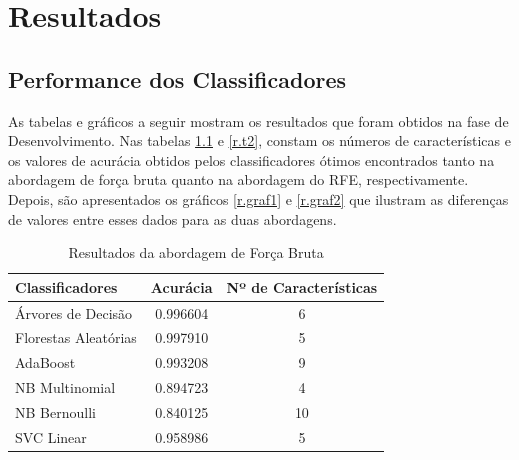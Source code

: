 \chapter{Resultados}
\label{c.resultados}

\section{Performance dos Classificadores}

As tabelas e gráficos a seguir mostram os resultados que foram obtidos na fase de Desenvolvimento. Nas tabelas \ref{r.t1} e \ref{r.t2}, constam os números de características e os valores de acurácia obtidos pelos classificadores ótimos encontrados tanto na abordagem de força bruta quanto na abordagem do RFE, respectivamente. Depois, são apresentados os gráficos \ref{r.graf1} e \ref{r.graf2} que ilustram as diferenças de valores entre esses dados para as duas abordagens.



\begin{table}[h!]
  \begin{center}
    \caption{Resultados da abordagem de Força Bruta}
    \label{r.t1}
    \begin{tabular}{l|c|c} %
      \textbf{Classificadores} & \textbf{Acurácia} & \textbf{Nº de Características}\\
      \hline
      Árvores de Decisão & 0.996604 & 6\\
      Florestas Aleatórias & 0.997910 & 5\\
      AdaBoost & 0.993208 & 9\\
      NB Multinomial & 0.894723 & 4\\
      NB Bernoulli & 0.840125 & 10\\
      SVC Linear & 0.958986 & 5\\
    \end{tabular}
  \end{center}
\end{table}

